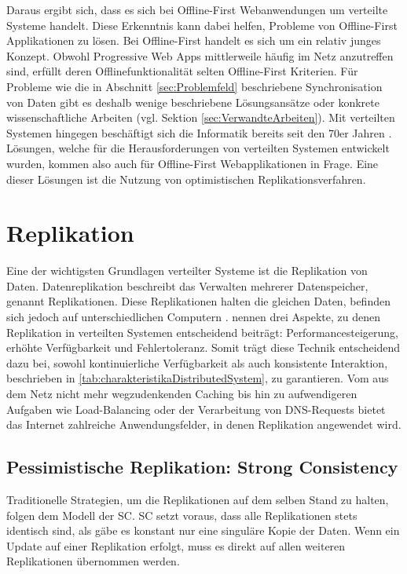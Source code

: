 \documentclass[a4paper, 12pt]{scrreprt}
\begin{document}
Daraus ergibt sich, dass es sich bei Offline-First Webanwendungen um verteilte Systeme handelt. Diese Erkenntnis kann dabei helfen, Probleme von Offline-First Applikationen zu lösen. Bei Offline-First handelt es sich um ein relativ junges Konzept. Obwohl Progressive Web Apps mittlerweile häufig im Netz anzutreffen sind, erfüllt deren Offlinefunktionalität selten Offline-First Kriterien. Für Probleme wie die in Abschnitt \ref{sec:Problemfeld} beschriebene Synchronisation von Daten gibt es deshalb wenige beschriebene Lösungsansätze oder konkrete wissenschaftliche Arbeiten (vgl. Sektion \ref{sec:VerwandteArbeiten}). Mit verteilten Systemen hingegen beschäftigt sich die Informatik bereits seit den 70er Jahren \autocite{Andrews1999FoundationsOM}. Lösungen, welche für die Herausforderungen von verteilten Systemen entwickelt wurden, kommen also auch für Offline-First Webapplikationen in Frage. Eine dieser Lösungen ist die Nutzung von optimistischen Replikationsverfahren. 

\section{Replikation}

Eine der wichtigsten Grundlagen verteilter Systeme ist die Replikation von Daten. Datenreplikation beschreibt das Verwalten mehrerer Datenspeicher, genannt Replikationen. Diese Replikationen halten die gleichen Daten, befinden sich jedoch auf unterschiedlichen Computern \autocite[S.42]{ArticleOptimisticReplication}. \citet{BookDistributedSystemsConceptsAndDesign} nennen drei Aspekte, zu denen Replikation in verteilten Systemen entscheidend beiträgt: Performancesteigerung, erhöhte Verfügbarkeit und Fehlertoleranz. Somit trägt diese Technik entscheidend dazu bei, sowohl kontinuierliche Verfügbarkeit als auch konsistente Interaktion, beschrieben in \ref{tab:charakteristikaDistributedSystem}, zu garantieren. Vom aus dem Netz nicht mehr wegzudenkenden Caching bis hin zu aufwendigeren Aufgaben wie Load-Balancing oder der Verarbeitung von DNS-Requests bietet das Internet zahlreiche Anwendungsfelder, in denen Replikation angewendet wird. 

\subsection{Pessimistische Replikation: Strong Consistency}

Traditionelle Strategien, um die Replikationen auf dem selben Stand zu halten, folgen dem Modell der \ac{SC}. \ac{SC} setzt voraus, dass alle Replikationen stets identisch sind, als gäbe es konstant nur eine singuläre Kopie der Daten. Wenn ein Update auf einer Replikation erfolgt, muss es direkt auf allen weiteren Replikationen übernommen werden. 
\end{document}
